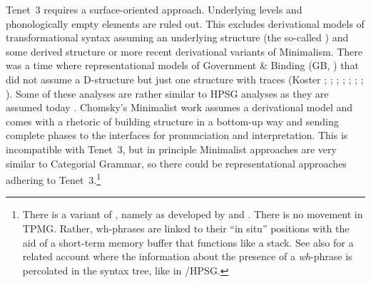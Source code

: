 \documentclass[output=paper]{langsci/langscibook}
\begin{document}
Tenet~3 requires a surface-oriented approach. Underlying levels and phonologically empty elements
are ruled out. This excludes derivational models of transformational syntax assuming an underlying
structure (the so-called ) and some derived structure or more recent derivational variants of Minimalism. There was a time
where representational models of Government \& Binding (GB, \citealt{Chomsky81a}) that did not assume a D-structure but just one structure with
traces (Koster \citeyear[\page ]{Koster78b-u}; \citeyear[]{Koster87a-u}; 
\citealp{KT91a}; \citealp[Section~1.4]{Haider93a}; 
\citealp[]{Frey93a}; \citealp[--88, 177--178]{Lohnstein93a-u}; \citealp[]{FC94a}; \citealp[]{Veenstra98a}). Some of these analyses are rather similar to HPSG
analyses as they are assumed today \citep{Kiss95a,BvN98a,Meurers2000b,Mueller2005c,MuellerGS,MuellerGermanic}. Chomsky's Minimalist work \citep{Chomsky95a-u} assumes a derivational model and comes
with a rhetoric of building structure in a bottom-up way and sending complete phases to the
interfaces for pronunciation and interpretation. This is incompatible with Tenet~3, but in principle
Minimalist approaches are very similar to Categorial Grammar, so there could be representational
approaches adhering to Tenet~3.\footnote{%
  There is a variant of  \citep{Stabler2010b}, namely  as developed by \citet{Chesi2004a-u,Chesi2007a-u} and \citet{BC2006a-u,BC2012a-u}. There is
  no movement in TPMG. Rather, wh-phrases are linked to their ``in situ'' positions with the
aid of a short-term memory  buffer that functions like a stack. See
also \citet{Hunter2010a-u,Hunter2018a-u} for a related account where the
information about the presence of a \emph{wh}-phrase is percolated in the
syntax tree, like in /HPSG. 
}
\end{document}
